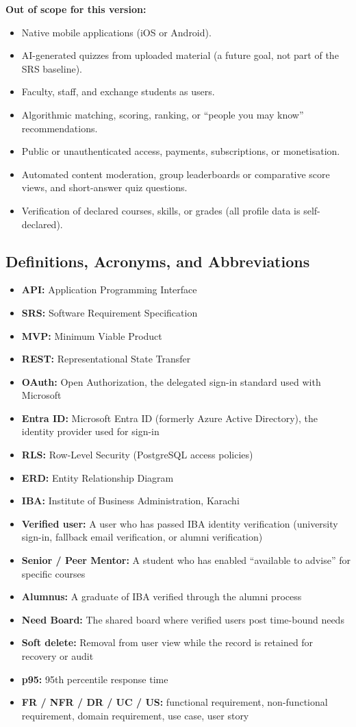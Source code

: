 \documentclass[10pt,a4paper]{article}
\begin{document}
\textbf{Out of scope for this version:}
\begin{itemize}
\item Native mobile applications (iOS or Android).
\item AI-generated quizzes from uploaded material (a future goal, not part of the SRS baseline).
\item Faculty, staff, and exchange students as users.
\item Algorithmic matching, scoring, ranking, or ``people you may know'' recommendations.
\item Public or unauthenticated access, payments, subscriptions, or monetisation.
\item Automated content moderation, group leaderboards or comparative score views, and short-answer quiz questions.
\item Verification of declared courses, skills, or grades (all profile data is self-declared).
\end{itemize}

\subsection{Definitions, Acronyms, and Abbreviations}
\begin{itemize}
\item \textbf{API:} Application Programming Interface
\item \textbf{SRS:} Software Requirement Specification
\item \textbf{MVP:} Minimum Viable Product
\item \textbf{REST:} Representational State Transfer
\item \textbf{OAuth:} Open Authorization, the delegated sign-in standard used with Microsoft
\item \textbf{Entra ID:} Microsoft Entra ID (formerly Azure Active Directory), the identity provider used for sign-in
\item \textbf{RLS:} Row-Level Security (PostgreSQL access policies)
\item \textbf{ERD:} Entity Relationship Diagram
\item \textbf{IBA:} Institute of Business Administration, Karachi
\item \textbf{Verified user:} A user who has passed IBA identity verification (university sign-in, fallback email verification, or alumni verification)
\item \textbf{Senior / Peer Mentor:} A student who has enabled ``available to advise'' for specific courses
\item \textbf{Alumnus:} A graduate of IBA verified through the alumni process
\item \textbf{Need Board:} The shared board where verified users post time-bound needs
\item \textbf{Soft delete:} Removal from user view while the record is retained for recovery or audit
\item \textbf{p95:} 95th percentile response time
\item \textbf{FR / NFR / DR / UC / US:} functional requirement, non-functional requirement, domain requirement, use case, user story
\end{itemize}
\end{document}
